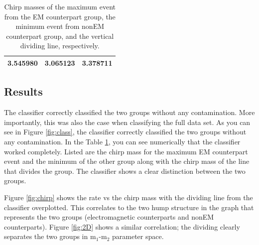 \begin{table}[ht]
\caption{Chirp masses of the maximum event from the EM counterpart group, the minimum event from nonEM counterpart group, and the vertical dividing line, respectively.}
\centering
\begin{tabular}{c c c}
\hline\hline
3.545980 & 3.065123 & 3.378711\\
\hline\hline
\end{tabular}
\label{tab:mass}
\end{table}

\subsection{Results}
The classifier correctly classified the two groups without any contamination. More importantly, this was also the case when classifying the full data set. As you can see in Figure \ref{fig:class}, the classifier correctly classified the two groups without any contamination. In the Table \ref{tab:mass}, you can see numerically that the classifier worked completely. Listed are the chirp mass for the maximum EM counterpart event and the minimum of the other group along with the chirp mass of the line that divides the group. The classifier shows a clear distinction between the two groups.



Figure \ref{fig:chirp} shows the rate vs the chirp mass with the dividing line from the classifier overplotted. This correlates to the two hump structure in the graph that represents the two groups (electromagnetic counterparts and nonEM counterparts). Figure \ref{fig:2D} shows a similar correlation; the dividing clearly separates the two groups in  m$_{1}$-m$_{2}$ parameter space.